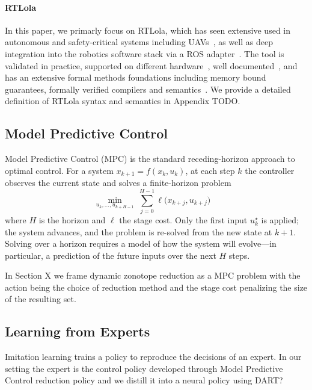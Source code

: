 \documentclass[letterpaper, 10 pt, conference]{ieeeconf}  %
\begin{document}
\paragraph{RTLola} In this paper, we primarly focus on RTLola, which has seen extensive used in autonomous and safety-critical systems including UAVs~\cite{DBLP:conf/cav/rtlolauav, DBLP:conf/cav/rtloltakeoff, dlr201362},  as well as deep integration into the robotics software stack via a ROS adapter~\cite{DBLP:conf/rv/ros}. The tool is validated in practice, supported on different hardware~\cite{DBLP:journals/tecs/fpga,BCFS25}, well documented~\cite{DBLP:conf/fm/rtlolatutorial,DBLP:conf/rv/rtloladesingandintegration}, and has an extensive formal methods foundations including memory bound guarantees, formally verified compilers and semantics~\cite{DBLP:journals/sttt/rtlolaverguar, DBLP:conf/rv/vermonitors,DBLP:conf/fm/semantics}. We provide a detailed definition of RTLola syntax and semantics in Appendix TODO.


\subsection{Model Predictive Control}
Model Predictive Control (MPC) is the standard receding-horizon approach to
optimal control. For a system $x_{k+1} = f(x_k, u_k)$, at each step $k$ the
controller observes the current state and solves a finite-horizon problem
%
\begin{equation}
  \min_{u_k,\dots,u_{k+H-1}}\ \sum_{j=0}^{H-1} \ell\big(x_{k+j}, u_{k+j}\big)
  \quad 
  \label{eq:mpc}
\end{equation}
%
where $H$ is the horizon and $\ell$ the stage cost. Only the first input
$u_k^\star$ is applied; the system advances, and the problem is re-solved from
the new state at $k+1$. Solving over a horizon requires a model of how the
system will evolve---in particular, a prediction of the future inputs over the
next $H$ steps.

In Section X we frame dynamic zonotope reduction as a MPC problem  with the action being the choice of reduction method and the stage
cost penalizing the size of the resulting set.

\subsection{Learning from Experts}
\label{sec:bg-imitation}
Imitation learning trains a policy to reproduce the decisions of an expert.  In our setting the expert is the control policy developed through Model Predictive Control reduction
policy and we distill it into a neural policy using DART?
\end{document}
